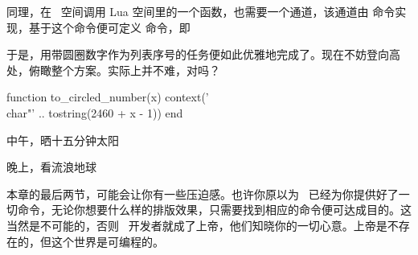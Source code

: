 同理，在 \CONTEXT\ 空间调用 Lua 空间里的一个函数，也需要一个通道，该通道由  命令实现，基于这个命令便可定义  命令，即

\startTEX
\def\CircledNumber#1{\ctxlua{to_circled_number(#1)}}
\stopTEX

\noindent 于是，用带圆圈数字作为列表序号的任务便如此优雅地完成了。现在不妨登向高处，俯瞰整个方案。实际上并不难，对吗？

\startexample
\startluacode
function to_circled_number(x)
  context('\\char"' .. tostring(2460 + x - 1))
end
\stopluacode

\def\CircledNumber#1{\ctxlua{to_circled_number(#1)}}

\startitemize[CircledNumber][stopper=]
\item 中午，晒十五分钟太阳
\item 晚上，看流浪地球 
\stopitemize
\stopexample
{}

\subject{结语}

本章的最后两节，可能会让你有一些压迫感。也许你原以为 \CONTEXT\ 已经为你提供好了一切命令，无论你想要什么样的排版效果，只需要找到相应的命令便可达成目的。这当然是不可能的，否则 \CONTEXT\ 开发者就成了上帝，他们知晓你的一切心意。上帝是不存在的，但这个世界是可编程的。
